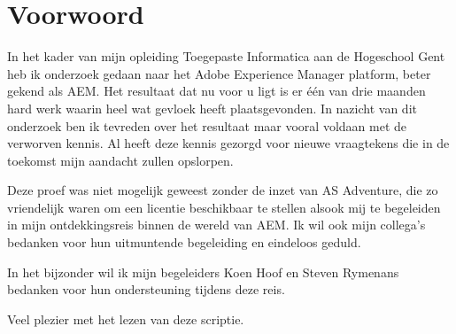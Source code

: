 \chapter{Voorwoord}
\label{ch:voorwoord}
	In het kader van mijn opleiding Toegepaste Informatica aan de Hogeschool Gent
	heb ik onderzoek gedaan naar het Adobe Experience Manager platform, beter gekend als AEM. 
	Het resultaat dat nu voor u ligt is er \'e\'en van drie maanden hard werk waarin heel wat gevloek heeft plaatsgevonden. 
	In nazicht van dit onderzoek ben ik tevreden over het resultaat maar vooral voldaan met de verworven kennis. 
	Al heeft deze kennis gezorgd voor nieuwe vraagtekens die in de toekomst mijn aandacht zullen opslorpen.
	\par
	\par
	Deze proef was niet mogelijk geweest zonder de inzet van AS Adventure, die zo vriendelijk waren om een licentie
	beschikbaar te stellen alsook mij te begeleiden in mijn ontdekkingsreis binnen de wereld van AEM. 
	Ik wil ook mijn collega’s bedanken voor hun uitmuntende begeleiding en eindeloos geduld.
	\par
	In het bijzonder wil ik mijn begeleiders Koen Hoof en Steven Rymenans bedanken voor hun ondersteuning tijdens deze reis.
	\par
	Veel plezier met het lezen van deze scriptie.